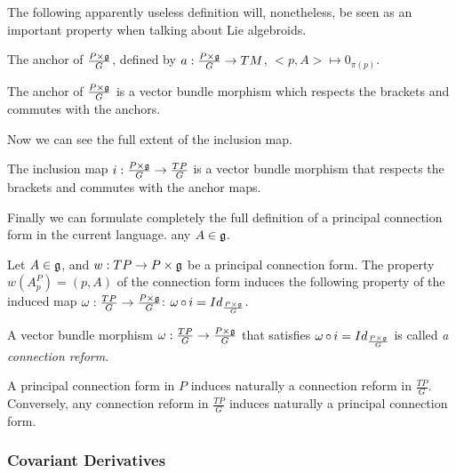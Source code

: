 The following apparently useless definition will, nonetheless, be seen as an important property when talking about Lie algebroids.

\begin{definition}
The anchor of $\frac{P \times \mathfrak{g}}{G}$, defined by $a:\frac{P \times \mathfrak{g}}{G} \to TM$, $<p, A> \mapsto 0_{\pi(p)}$.
\end{definition}

\begin{proposition}
The anchor of $\frac{P \times \mathfrak{g}}{G}$ is a vector bundle morphism which respects the brackets and commutes with the anchors.
\end{proposition}

Now we can see the full extent of the inclusion map.

\begin{theorem}
The inclusion map $i:\frac{P \times \mathfrak{g}}{G} \to \frac{TP}{G}$ is a vector bundle morphism that respects the brackets and commutes with the anchor maps.
\end{theorem}

Finally we can formulate completely the full definition of a principal connection form in the current language. any $A \in \mathfrak{g}$.

\begin{proposition}
Let $A \in \mathfrak{g}$, and $w:TP \to P \times \mathfrak{g}$ be a principal connection form. The property $w(A^P_p) = (p, A)$ of the connection form induces the following property of the induced map $\omega:\frac{TP}{G} \to \frac{P \times \mathfrak{g}}{G}$: $\omega \operatorname{\circ} i = Id_{\frac{P \times \mathfrak{g}}{G}}$.
\end{proposition}

\begin{definition} 
A vector bundle morphism $\omega:\frac{TP}{G} \to \frac{P \times \mathfrak{g}}{G}$ that satisfies $\omega \operatorname{\circ} i = Id_{\frac{P \times \mathfrak{g}}{G}}$ is called \emph{a connection reform}.
\end{definition}


\begin{theorem}
A principal connection form in $P$ induces naturally a connection reform in $\frac{TP}{G}$. Conversely, any connection reform in $\frac{TP}{G}$ induces naturally a principal connection form.
\end{theorem}


\subsubsection{Covariant Derivatives}


